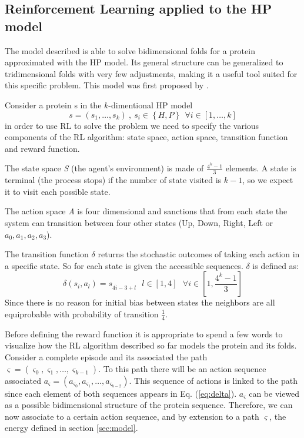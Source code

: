\subsection{Reinforcement Learning applied to the HP model}
The model described is able to solve bidimensional folds for a protein approximated with the HP model.
Its general structure can be generalized to tridimensional folds with very few adjustments, making it a useful tool suited for this specific problem.
This model was first proposed by \cite{czibula2011reinforcement}.

Consider a protein s in the $k$-dimentional HP model $$s = \left(s_1, \ldots, s_k\right) \ , \ s_i \in \left\{H, P\right\} \ \ \forall i \in \left[1,\ldots,k\right]$$ in order to use RL to solve the problem we need to specify the various components of the RL algorithm: state space, action space, transition function and reward function.

The state space \emph{S} (the agent's environment) is made of $\frac{4^{k}-1}{3}$ elements.
A state is terminal (the process stops) if the number of state visited is $k-1$, so we expect it to visit each possible state. 

The action space \emph{A} is four dimensional and sanctions that from each state the system can transition between four other states (Up, Down, Right, Left or $a_{0}, a_{1}, a_{2}, a_{3}$).

The transition function $\delta$ returns the stochastic outcomes of taking each action in a specific state.
So for each state is given the accessible sequences.
$\delta$ is defined as:
\begin{equation}
\delta(s_{i},a_{l})=s_{4 \dot i - 3 + l} \ \ \ l \in [1, 4] \ \ \ \forall i \in \left[1,\frac{4^{k}-1}{3}\right]
\label{eq:delta}
\end{equation}
Since there is no reason for initial bias between states the neighbors are all equiprobable with probability of transition $\frac{1}{4}$.

Before defining the reward function it is appropriate to spend a few words to visualize how the RL algorithm described so far models the protein and its folds.
Consider a complete episode and its associated the path $\varsigma = (\varsigma_{0}, \varsigma_1, \ldots , \varsigma_{k-1})$.
To this path there will be an action sequence associated $a_{\varsigma} = (a_{\varsigma_{0}}, a_{\varsigma_{1}}, \ldots , a_{\varsigma_{k-2}})$.
This sequence of actions is linked to the path since each element of both sequences appears in Eq. (\ref{eq:delta}).
$a_{\varsigma}$ can be viewed as a possible bidimensional structure of the protein sequence.
Therefore, we can now associate to a certain action sequence, and by extension to a path $\varsigma$, the energy defined in section \ref{sec:model}. 

